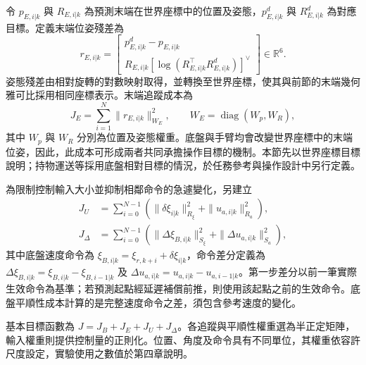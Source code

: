 令 $p_{E,i|k}$ 與 $R_{E,i|k}$ 為預測末端在世界座標中的位置及姿態，$p_{E,i|k}^{d}$ 與 $R_{E,i|k}^{d}$ 為對應目標。定義末端位姿殘差為
\begin{equation}
    r_{E,i|k}=
    \begin{bmatrix}
        p_{E,i|k}^{d}-p_{E,i|k} \\
        R_{E,i|k}
        \left[\log\!\left(R_{E,i|k}^{\top}R_{E,i|k}^{d}\right)\right]^{\vee}
    \end{bmatrix}
    \in\mathbb{R}^{6}.
    \label{eq:ch3_tcp_pose_residual}
\end{equation}
姿態殘差由相對旋轉的對數映射取得，並轉換至世界座標，使其與前節的末端幾何雅可比採用相同座標表示。末端追蹤成本為
\begin{equation}
    J_E=\sum_{i=1}^{N}\|r_{E,i|k}\|_{W_E}^{2},
    \qquad
    W_E=\operatorname{diag}(W_p,W_R),
    \label{eq:ch3_tcp_tracking_cost}
\end{equation}
其中 $W_p$ 與 $W_R$ 分別為位置及姿態權重。底盤與手臂均會改變世界座標中的末端位姿，因此，此成本可形成兩者共同承擔操作目標的機制。本節先以世界座標目標說明；持物運送等採用底盤相對目標的情況，於任務參考與操作設計中另行定義。

為限制控制輸入大小並抑制相鄰命令的急遽變化，另建立
\begin{equation}
    \begin{aligned}
        J_U
        &=\sum_{i=0}^{N-1}
          \left(
              \|\delta\xi_{i|k}\|_{R_{\xi}}^{2}
              +\|u_{a,i|k}\|_{R_a}^{2}
          \right), \\
        J_{\Delta}
        &=\sum_{i=0}^{N-1}
          \left(
              \|\Delta\xi_{B,i|k}\|_{S_{\xi}}^{2}
              +\|\Delta u_{a,i|k}\|_{S_a}^{2}
          \right),
    \end{aligned}
    \label{eq:ch3_input_smoothness_cost}
\end{equation}
其中底盤速度命令為 $\xi_{B,i|k}=\xi_{r,k+i}+\delta\xi_{i|k}$，命令差分定義為 $\Delta\xi_{B,i|k}=\xi_{B,i|k}-\xi_{B,i-1|k}$ 及 $\Delta u_{a,i|k}=u_{a,i|k}-u_{a,i-1|k}$。第一步差分以前一筆實際生效命令為基準；若預測起點經延遲補償前推，則使用該起點之前的生效命令。底盤平順性成本計算的是完整速度命令之差，須包含參考速度的變化。

基本目標函數為 $J=J_B+J_E+J_U+J_{\Delta}$。各追蹤與平順性權重選為半正定矩陣，輸入權重則提供控制量的正則化。位置、角度及命令具有不同單位，其權重依容許尺度設定，實驗使用之數值於第四章說明。


